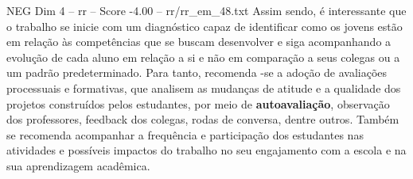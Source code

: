 \begin{textsample}{NEG Dim 4 – rr – Score -4.00 – rr/rr\_em\_48.txt}
Assim sendo, é interessante que o trabalho se inicie com um diagnóstico capaz de identificar como os jovens estão em relação às competências que se buscam desenvolver e siga acompanhando a evolução de cada aluno em relação a si e não em comparação a seus colegas ou a um padrão predeterminado.
Para tanto, recomenda -se a adoção de avaliações processuais e formativas, que analisem as mudanças de atitude e a qualidade dos projetos construídos pelos estudantes, por meio de \textbf{autoavaliação}, observação dos professores, feedback dos colegas, rodas de conversa, dentre outros.
Também se recomenda acompanhar a frequência e participação dos estudantes nas atividades e possíveis impactos do trabalho no seu engajamento com a escola e na sua aprendizagem acadêmica.

\end{textsample}
